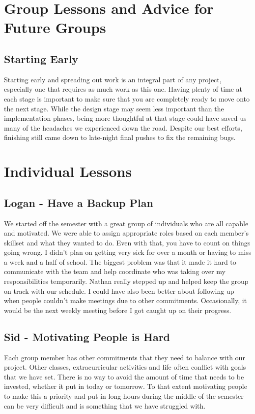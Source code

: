 \section{Group Lessons and Advice for Future Groups}
\subsection{Starting Early}
Starting early and spreading out work is an integral part of any project, especially one that requires as much work as this one. Having plenty of time at each stage is important to make sure that you are completely ready to move onto the next stage. While the design stage may seem less important than the implementation phases, being more thoughtful at that stage could have saved us many of the headaches we experienced down the road. Despite our best efforts, finishing still came down to late-night final pushes to fix the remaining bugs.

\section{Individual Lessons}
\subsection{Logan - Have a Backup Plan}
We started off the semester with a great group of individuals who are all capable and motivated. We were able to assign appropriate roles based on each member's skillset and what they wanted to do. Even with that, you have to count on things going wrong. I didn’t plan on getting very sick for over a month or having to miss a week and a half of school. The biggest problem was that it made it hard to communicate with the team and help coordinate who was taking over my responsibilities temporarily. Nathan really stepped up and helped keep the group on track with our schedule. I could have also been better about following up when people couldn’t make meetings due to other commitments. Occasionally, it would be the next weekly meeting before I got caught up on their progress. 

\subsection{Sid - Motivating People is Hard}
Each group member has other commitments that they need to balance with our project. Other classes, extracurricular activities and life often conflict with goals that we have set. There is no way to avoid the amount of time that needs to be invested, whether it put in today or tomorrow. To that extent motivating people to make this a priority and put in long hours during the middle of the semester can be very difficult and is something that we have struggled with. 

